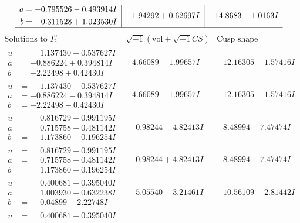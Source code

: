 \documentclass[1p]{elsarticle_modified}
\theoremstyle{definition}
\newcommand{\I}{\sqrt{-1}}
\begin{document}
$$\begin{array}{c|c|c}
\begin{aligned}
a &= -0.795526 - 0.493914 I \\
b &= -0.311528 + 1.023530 I\end{aligned}
 & -1.94292 + 0.62697 I & -14.8683 - 1.0163 I\\
 \hline 
 \end{array}$$\newpage$$\begin{array}{c|c|c}  
\text{Solutions to }I^u_{2}& \I (\text{vol} + \sqrt{-1}CS) & \text{Cusp shape}\\
 \hline 
\begin{aligned}
u &= \phantom{-}1.137430 + 0.537627 I \\
a &= -0.886224 + 0.394814 I \\
b &= -2.22498 + 0.42430 I\end{aligned}
 & -4.66089 - 1.99657 I & -12.16305 - 1.57416 I \\ \hline\begin{aligned}
u &= \phantom{-}1.137430 - 0.537627 I \\
a &= -0.886224 - 0.394814 I \\
b &= -2.22498 - 0.42430 I\end{aligned}
 & -4.66089 + 1.99657 I & -12.16305 + 1.57416 I \\ \hline\begin{aligned}
u &= \phantom{-}0.816729 + 0.991195 I \\
a &= \phantom{-}0.715758 - 0.481142 I \\
b &= \phantom{-}1.173860 + 0.196254 I\end{aligned}
 & \phantom{-}0.98244 - 4.82413 I & -8.48994 + 7.47474 I \\ \hline\begin{aligned}
u &= \phantom{-}0.816729 - 0.991195 I \\
a &= \phantom{-}0.715758 + 0.481142 I \\
b &= \phantom{-}1.173860 - 0.196254 I\end{aligned}
 & \phantom{-}0.98244 + 4.82413 I & -8.48994 - 7.47474 I \\ \hline\begin{aligned}
u &= \phantom{-}0.400681 + 0.395040 I \\
a &= \phantom{-}1.003930 - 0.632238 I \\
b &= \phantom{-}0.04899 + 2.22748 I\end{aligned}
 & \phantom{-}5.05540 - 3.21461 I & -10.56109 + 2.81442 I \\ \hline\begin{aligned}
u &= \phantom{-}0.400681 - 0.395040 I \\

\end{aligned}
\end{array}$$
\end{document}
